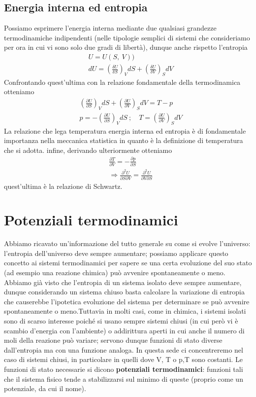 \documentclass[10pt,a4paper]{article}
\begin{document}
\subsection{Energia interna ed entropia}
Possiamo esprimere l'energia interna mediante due qualsiasi grandezze termodinamiche indipendenti (nelle tipologie semplici di sistemi che consideriamo per ora in cui vi sono solo due gradi di libertà), dunque anche rispetto l'entropia
\begin{align*}
	&U = U(S,\ V))\\
	&dU = \left(\frac{\delta U}{\delta S}\right)_V dS + \left(\frac{\delta U}{\delta V}\right)_S dV
\end{align*} 
Confrontando quest'ultima con la relazione fondamentale della termodinamica otteniamo 
\begin{align*}
	&\left(\frac{\partial U}{\partial S}\right)_V dS + \left(\frac{\partial U}{\partial V}\right)_S dV = T-p\\
	&p = -\left(\frac{\partial U}{\partial S}\right)_V dS\ ; \quad T=\left(\frac{\partial U}{\partial V}\right)_S dV
\end{align*}
La relazione che lega temperatura energia interna ed entropia è di fondamentale importanza nella meccanica statistica in quanto è la definizione di temperatura che si adotta. infine, derivando ulteriormente otteniamo
\begin{align*}
	&\frac{\partial T}{\partial V} = - \frac{\partial p}{\partial S}\\
	&\Rightarrow \frac{\partial^2 U}{\partial S\partial V} = \frac{\partial^2 U}{\partial V\partial S}
\end{align*}
quest'ultima è la relazione di Schwartz. 
\section{Potenziali termodinamici}
Abbiamo ricavato un'informazione del tutto generale su come si evolve l'universo: l'entropia dell'universo deve sempre aumentare; possiamo applicare questo concetto ai sistemi termodinamici per sapere se una certa evoluzione del suo stato (ad esempio una reazione chimica) può avvenire spontaneamente o meno. Abbiamo già visto che l'entropia di un sistema isolato deve sempre aumentare, dunque considerando un sistema chiuso basta calcolare la variazione di entropia che causerebbe l'ipotetica evoluzione del sistema per determinare se può avvenire spontaneamente o meno.Tuttavia in molti casi, come in chimica, i sistemi isolati sono di scarso interesse poiché si usano sempre sistemi chiusi (in cui però vi è scambio d'energia con l'ambiente) o addirittura aperti in cui anche il numero di moli della reazione può variare; servono dunque funzioni di stato diverse dall'entropia ma con una funzione analoga. In questa sede ci concentreremo nel caso di sistemi chiusi, in particolare in quelli dove V, T o p,T sono costanti. Le funzioni di stato necessarie si dicono \textbf{potenziali termodinamici}: funzioni tali che il sistema fisico tende a stabilizzarsi sul minimo di queste (proprio come un potenziale, da cui il nome). 
\end{document}
